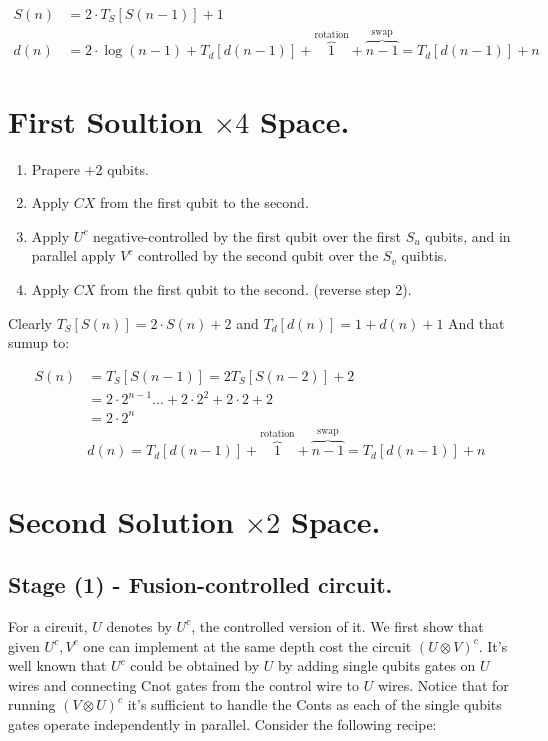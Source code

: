 \documentclass[manuscript,screen,review]{acmart}
\begin{document}
\begin{equation*}
\begin{split} 
S(n) &= 2 \cdot T_{S}[S(n-1)] + 1   \\
d(n) &= 2\cdot \log(n-1) +  T_{d}[d(n-1)] + \overbrace{1}^{ \text{rotation} } + \overbrace{n-1}^{\text{swap}} =  T_{d}[d(n-1)] + n  
\end{split} 
\end{equation*}

\section{First Soultion $\times 4$ Space.}
\begin{enumerate}
  \item Prapere $+2$ qubits.
  \item Apply $CX$ from the first qubit to the second.
  \item Apply $U^{c}$ negative-controlled by the first qubit over the first $S_{u}$ qubits, and in parallel apply $V^{c}$ controlled by the second qubit over the $S_{v}$ quibtis.   
  \item Apply $CX$ from the first qubit to the second. (reverse step 2).
\end{enumerate}
Clearly $T_{S}[S(n)] = 2 \cdot S(n) + 2$ and $T_{d}[d(n)] = 1 + d(n) + 1$ And that sumup to:

\begin{equation*}
\begin{split}
  S(n) &  = T_{S}[S(n-1)] = 2T_{S}[S(n-2)] + 2   \\
  & = 2\cdot 2^{n - 1}...+2\cdot 2^{2} +2\cdot 2 + 2  \\
  & = 2\cdot 2^{n}  \\ 
  & d(n) = T_{d}[d(n-1)] + \overbrace{1}^{ \text{rotation} } + \overbrace{n-1}^{\text{swap}} =  T_{d}[d(n-1)] + n 
\end{split} 
\end{equation*}

\section{Second Solution $\times 2$ Space. }

\subsection{Stage (1) - Fusion-controlled circuit.}

For a circuit, $U$ denotes by $U^{c}$, the controlled version of it. We first show that given $U^{c},V^{c}$ one can implement at the same depth cost the circuit $(U\otimes V)^{c}$. It's well known that $U^{c}$ could be obtained by $U$ by adding single qubits gates on $U$ wires and connecting Cnot gates from the control wire to $U$ wires. Notice that for running $(V\otimes U)^{c}$ it's sufficient to handle the Conts as each of the single qubits gates operate independently in parallel. Consider the following recipe: 
\end{document}
